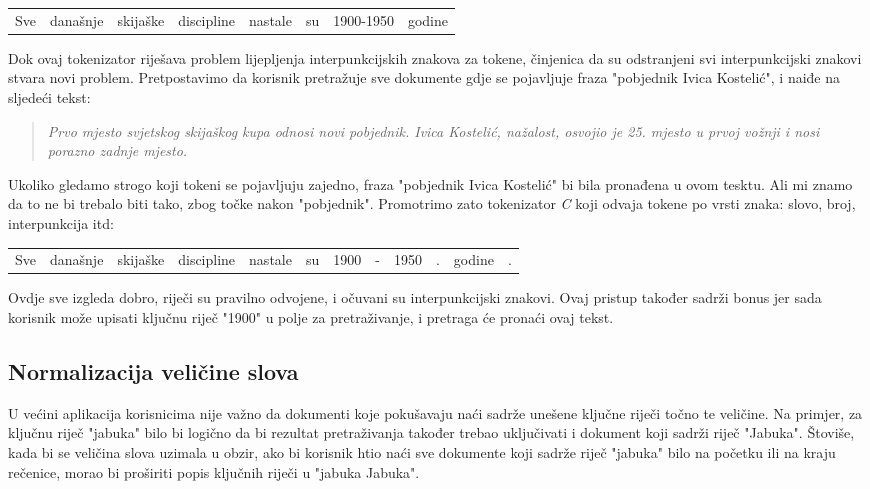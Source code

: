\documentclass[11pt]{scrreprt}
\begin{document}
\begin{center}
  \begin{tabular}{cccccccc}
    Sve & današnje & skijaške & discipline & nastale & su & 1900-1950 & godine
  \end{tabular}
\end{center}

Dok ovaj tokenizator riješava problem lijepljenja interpunkcijskih znakova za tokene, činjenica da su odstranjeni svi interpunkcijski znakovi stvara novi problem. Pretpostavimo da korisnik pretražuje sve dokumente gdje se pojavljuje fraza "pobjednik Ivica Kostelić", i naiđe na sljedeći tekst:

\begin{quote}
  \textit{Prvo mjesto svjetskog skijaškog kupa odnosi novi pobjednik. Ivica Kostelić, nažalost, osvojio je 25. mjesto u prvoj vožnji i nosi porazno zadnje mjesto.}
\end{quote}

Ukoliko gledamo strogo koji tokeni se pojavljuju zajedno, fraza "pobjednik Ivica Kostelić" bi bila pronađena u ovom tesktu. Ali mi znamo da to ne bi trebalo biti tako, zbog točke nakon "pobjednik". Promotrimo zato tokenizator \textit{C} koji odvaja tokene po vrsti znaka: slovo, broj, interpunkcija itd:

\begin{center}
  \begin{tabular}{cccccccccccc}
    Sve & današnje & skijaške & discipline & nastale & su & 1900 & - & 1950 & . & godine & .
  \end{tabular}
\end{center}

Ovdje sve izgleda dobro, riječi su pravilno odvojene, i očuvani su interpunkcijski znakovi. Ovaj pristup također sadrži bonus jer sada korisnik može upisati ključnu riječ "1900" u polje za pretraživanje, i pretraga će pronaći ovaj tekst.

\subsection{Normalizacija veličine slova}

U većini aplikacija korisnicima nije važno da dokumenti koje pokušavaju naći sadrže unešene ključne riječi točno te veličine. Na primjer, za ključnu riječ "jabuka" bilo bi logično da bi rezultat pretraživanja također trebao uključivati i dokument koji sadrži riječ "Jabuka". Štoviše, kada bi se veličina slova uzimala u obzir, ako bi korisnik htio naći sve dokumente koji sadrže riječ "jabuka" bilo na početku ili na kraju rečenice, morao bi proširiti popis ključnih riječi u "jabuka Jabuka".
\end{document}
